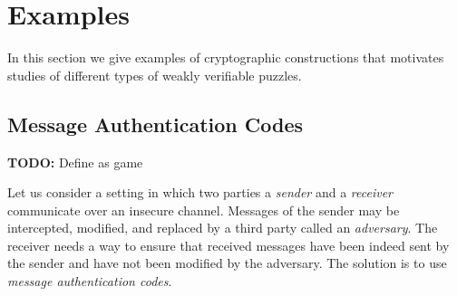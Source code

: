 \section{Examples}
\label{section:wvp_examples}
In this section we give examples of cryptographic constructions that motivates studies of different types of weakly verifiable puzzles.

\subsection{Message Authentication Codes}
\begin{todo}
  \textbf{TODO:} Define as game
\end{todo}
Let us consider a setting in which two parties a \textit{sender} and a \textit{receiver} communicate over an insecure channel.
Messages of the sender may be intercepted, modified, and replaced by a third party called an \textit{adversary}.
The receiver needs a way to ensure that received messages have been indeed sent by the sender and have not been modified by the adversary.
The solution is to use \textit{message authentication codes}.

